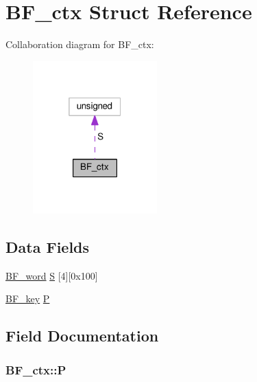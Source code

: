 \hypertarget{structBF__ctx}{}\section{B\+F\+\_\+ctx Struct Reference}
\label{structBF__ctx}


Collaboration diagram for B\+F\+\_\+ctx\+:
\nopagebreak
\begin{figure}[H]
\begin{center}
\leavevmode
\includegraphics[width=136pt]{structBF__ctx__coll__graph}
\end{center}
\end{figure}
\subsection*{Data Fields}
\begin{DoxyCompactItemize}
\item 
\hyperlink{crypt__blowfish_8c_adfbe8e073e752df4092eb8de731ea913}{B\+F\+\_\+word} \hyperlink{structBF__ctx_ae16879b199664e199cacb4fe5d43d94b}{S} \mbox{[}4\mbox{]}\mbox{[}0x100\mbox{]}
\item 
\hyperlink{crypt__blowfish_8c_ae2b43e84854b238122d89477fa1a88d3}{B\+F\+\_\+key} \hyperlink{structBF__ctx_a54b05caa5443c19de34d210ec7b13120}{P}
\end{DoxyCompactItemize}


\subsection{Field Documentation}
\subsubsection[{\texorpdfstring{P}{P}}]{ B\+F\+\_\+ctx\+::P}\hypertarget{structBF__ctx_a54b05caa5443c19de34d210ec7b13120}{}\label{structBF__ctx_a54b05caa5443c19de34d210ec7b13120}
